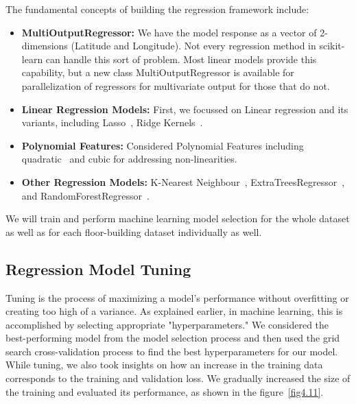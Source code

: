 \documentclass[a4paper,singleside,12pt]{report} %
\begin{document}
				The fundamental concepts of building the regression framework include:
				\begin{itemize}
				\item \textbf{MultiOutputRegressor:} We have the model response as a vector of 2-dimensions (Latitude and Longitude). 
				Not every regression method in scikit-learn can handle this sort of problem. 
				Most linear models provide this capability, but a new class MultiOutputRegressor is available for parallelization of regressors for multivariate output for those that do not.
				\item \textbf{Linear Regression Models:} First, we focussed on Linear regression and its variants, including Lasso~\cite{zhang2008sparsity}, Ridge Kernels~\cite{mcdonald2009ridge}.
				\item \textbf{Polynomial Features:} Considered Polynomial Features including quadratic~\cite{ostertagova2012modelling} and cubic for addressing non-linearities.
				\item \textbf{Other Regression Models:} K-Nearest Neighbour~\cite{goldberger2004neighbourhood, kramer2013k,zhang2016introduction}, ExtraTreesRegressor~\cite{geurts2006extremely}, and RandomForestRegressor~\cite{segal2004machine}.
				\end{itemize}
				
				We will train and perform machine learning model selection for the whole dataset as well as for each floor-building dataset individually as well.
				
							\subsection{Regression Model Tuning}
				
				Tuning is the process of maximizing a model's performance without overfitting or creating too high of a variance. 
				As explained earlier, in machine learning, this is accomplished by selecting appropriate "hyperparameters." 
				We considered the best-performing model from the model selection process and then used the grid search cross-validation process to find the best hyperparameters for our model.
				While tuning, we also took insights on how an increase in the training data corresponds to the training and validation loss. 
				We gradually increased the size of the training and evaluated its performance, as shown in the figure~\ref{fig4.11}. 
\end{document}
